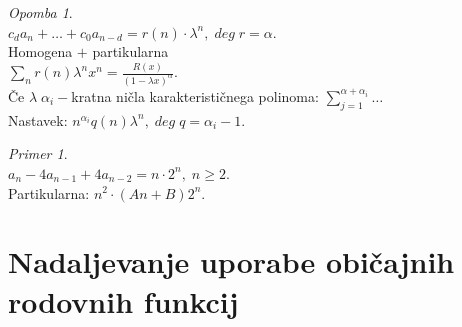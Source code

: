 \documentclass[a4paper, 12pt]{book}
\theoremstyle{definition}
\theoremstyle{remark}
\newtheorem*{ex}{Primer}
\newtheorem*{rem}{Opomba}
\begin{document}
\begin{rem} \text{} \\
  $c_d a_n + \dots + c_0 a_{n-d} = r(n) \cdot \lambda^n, \; deg \; r = \alpha$. \\
  Homogena $+$ partikularna \\
  $\sum_n r(n) \lambda^n x^n = \frac{R(x)}{(1-\lambda x)^{\alpha}}$. \\
  Če $\lambda \; \alpha_i-$kratna ničla karakterističnega polinoma: $\sum_{j=1}^{\alpha + \alpha_i} \dots$ \\
  Nastavek: $n^{\alpha_i} q(n) \lambda^n, \; deg \; q = \alpha_i - 1$.
\end{rem}
\begin{ex} \text{} \\
  $a_n - 4 a_{n-1} + 4 a_{n-2} = n \cdot 2^n, \; n \geq 2$. \\
  Partikularna: $n^2 \cdot (An + B) 2^n$.
\end{ex}


\section{Nadaljevanje uporabe običajnih rodovnih funkcij}
\end{document}
